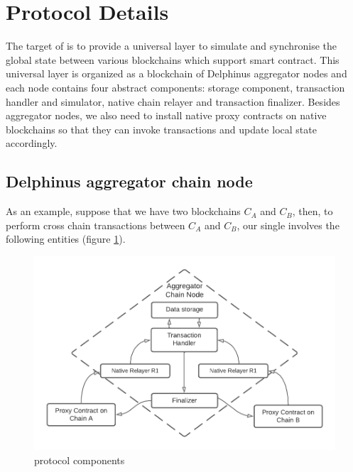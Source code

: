 \documentclass[pageno]{jpaper}
\begin{document}
\section{Protocol Details}
The target of \dprotocol is to provide a universal layer to simulate and synchronise the global state between various blockchains which support smart contract. This universal layer is organized as a blockchain of Delphinus aggregator nodes and each node contains four abstract components: storage component, transaction handler and simulator, native chain relayer and transaction finalizer.  Besides aggregator nodes, we also need to install native proxy contracts on native blockchains so that they can invoke transactions and update local state accordingly.


\subsection{Delphinus aggregator chain node}
As an example, suppose that we have two blockchains $C_{A}$ and $C_{B}$, then, to perform cross chain transactions between $C_A$  and $C_B$, our single \dprotocol involves the following entities (figure \ref{protocol-components}). 
\begin{figure}[ht]
\caption{protocol components}
\label{protocol-components}
\includegraphics[scale=0.5]{components}
\end{figure}
\end{document}
